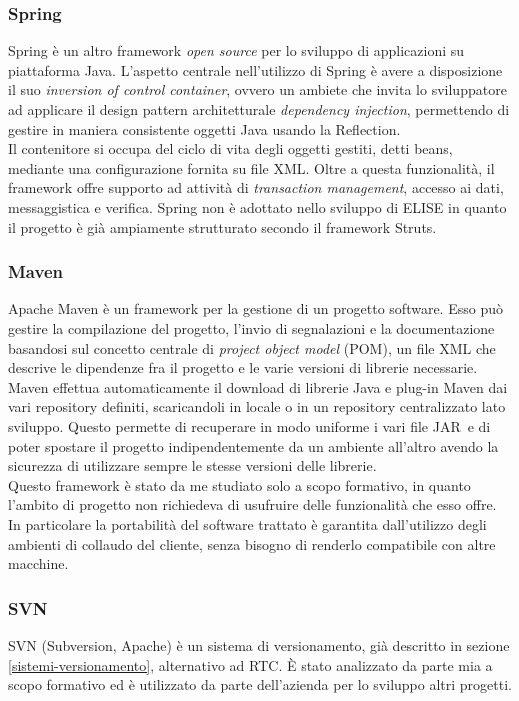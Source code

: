 	\subsubsection{Spring}	
	Spring è un altro framework \textit{open source} per lo sviluppo di applicazioni su piattaforma Java. L'aspetto centrale nell'utilizzo di Spring è avere a disposizione il suo \textit{inversion of control container}, ovvero un ambiete che invita lo sviluppatore ad applicare il design pattern architetturale \textit{dependency injection}, permettendo di gestire in maniera consistente oggetti Java usando la Reflection.\\
	
	Il contenitore si occupa del ciclo di vita degli oggetti gestiti, detti beans, mediante una configurazione fornita su file XML. Oltre a questa funzionalità, il framework offre supporto ad attività di \textit{transaction management}, accesso ai dati, messaggistica e verifica. Spring non è adottato nello sviluppo di ELISE in quanto il progetto è già ampiamente strutturato secondo il framework Struts.
	
	\subsubsection{Maven}	
	Apache Maven è un framework per la gestione di un progetto software. Esso può gestire la compilazione del progetto, l'invio di segnalazioni e la documentazione basandosi sul concetto centrale di \textit{project object model} (POM), un file XML che descrive le dipendenze fra il progetto e le varie versioni di librerie necessarie.\\
	
	Maven effettua automaticamente il download di librerie Java e plug-in Maven dai vari repository definiti, scaricandoli in locale o in un repository centralizzato lato sviluppo. Questo permette di recuperare in modo uniforme i vari file JAR\glossario\ e di poter spostare il progetto indipendentemente da un ambiente all'altro avendo la sicurezza di utilizzare sempre le stesse versioni delle librerie.\\
	
	Questo framework è stato da me studiato solo a scopo formativo, in quanto l'ambito di progetto non richiedeva di usufruire delle funzionalità che esso offre. In particolare la portabilità del software trattato è garantita dall'utilizzo degli ambienti di collaudo del cliente, senza bisogno di renderlo compatibile con altre macchine.
	
	\subsubsection{SVN}	
	SVN (Subversion, Apache) è un sistema di versionamento, già descritto in sezione \ref{sistemi-versionamento}, alternativo ad RTC. È stato analizzato da parte mia a scopo formativo ed è utilizzato da parte dell'azienda per lo sviluppo altri progetti.

